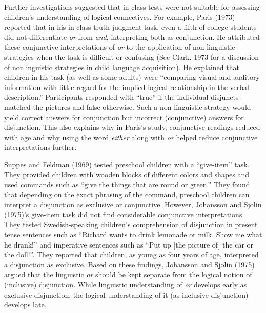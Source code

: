 \documentclass[floatsintext,man]{apa6}
\theoremstyle{definition}
\theoremstyle{definition}
\theoremstyle{definition}
\theoremstyle{remark}
\begin{document}
Further investigations suggested that in-class tests were not suitable
for assessing children's understanding of logical connectives. For
example, Paris (1973) reported that in his in-class truth-judgment task,
even a fifth of college students did not differentiate \emph{or} from
\emph{and}, interpreting both as conjunction. He attributed these
conjunctive interpretations of \emph{or} to the application of
non-linguistic strategies when the task is difficult or confusing (See
Clark, 1973 for a discussion of nonlinguistic strategies in child
language acquisition). He explained that children in his task (as well
as some adults) were \enquote{comparing visual and auditory information
with little regard for the implied logical relationship in the verbal
description.} Participants responded with \enquote{true} if the
individual disjuncts matched the pictures and false otherwise. Such a
non-linguistic strategy would yield correct answers for conjunction but
incorrect (conjunctive) answers for disjunction. This also explains why
in Paris's study, conjunctive readings reduced with age and why using
the word \emph{either} along with \emph{or} helped reduce conjunctive
interpretations further.

Suppes and Feldman (1969) tested preschool children with a
\enquote{give-item} task. They provided children with wooden blocks of
different colors and shapes and used commands such as \enquote{give the
things that are round or green.} They found that depending on the exact
phrasing of the command, preschool children can interpret a disjunction
as exclusive or conjunctive. However, Johansson and Sjolin (1975)'s
give-item task did not find considerable conjunctive interpretations.
They tested Swedish-speaking children's comprehension of disjunction in
present tense sentences such as \enquote{Richard wants to drink lemonade
or milk. Show me what he drank!} and imperative sentences such as
\enquote{Put up {[}the picture of{]} the car or the doll!}. They
reported that children, as young as four years of age, interpreted a
disjunction as exclusive. Based on these findings, Johansson and Sjolin
(1975) argued that the linguistic \emph{or} should be kept separate from
the logical notion of (inclusive) disjunction. While linguistic
understanding of \emph{or} develops early as exclusive disjunction, the
logical understanding of it (as inclusive disjunction) develops late.
\end{document}
